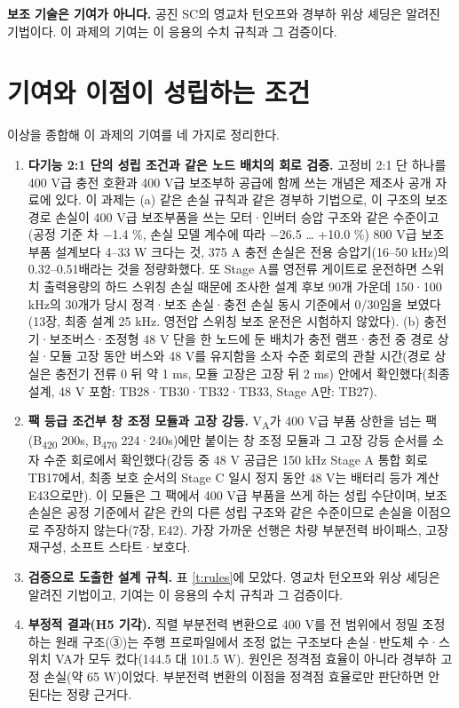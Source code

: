 \textbf{보조 기술은 기여가 아니다.} 공진 SC의 영교차 턴오프\cite{b53,b54}와 경부하 위상 셰딩\cite{b55}은 알려진 기법이다. 이 과제의 기여는 이 응용의 수치 규칙과 그 검증이다.

\section{기여와 이점이 성립하는 조건}

이상을 종합해 이 과제의 기여를 네 가지로 정리한다.

\begin{enumerate}[label=\arabic*.]
\item \textbf{다기능 2:1 단의 성립 조건과 같은 노드 배치의 회로 검증.} 고정비 2:1 단 하나를 400 V급 충전 호환과 400 V급 보조부하 공급에 함께 쓰는 개념은 제조사 공개 자료\cite{b35,b36,b37,b38}에 있다. 이 과제는 (a) 같은 손실 규칙과 같은 경부하 기법으로, 이 구조의 보조 경로 손실이 400 V급 보조부품을 쓰는 모터·인버터 승압 구조와 같은 수준이고(공정 기준 차 −1.4 \%, 손실 모델 계수에 따라 −26.5 … +10.0 \%) 800 V급 보조부품 설계보다 4–33 W 크다는 것, 375 A 충전 손실은 전용 승압기(16–50 kHz)의 0.32–0.51배라는 것을 정량화했다. 또 Stage A를 영전류 게이트로 운전하면 스위치 출력용량의 하드 스위칭 손실 때문에 조사한 설계 후보 90개 가운데 150·100 kHz의 30개가 당시 정격·보조 손실·충전 손실 동시 기준에서 0/30임을 보였다(13장, 최종 설계 25 kHz. 영전압 스위칭 보조 운전은 시험하지 않았다). (b) 충전기·보조버스·조정형 48 V 단을 한 노드에 둔 배치가 충전 램프·충전 중 경로 상실·모듈 고장 동안 버스와 48 V를 유지함을 소자 수준 회로의 관찰 시간(경로 상실은 충전기 전류 0 뒤 약 1 ms, 모듈 고장은 고장 뒤 2 ms) 안에서 확인했다(최종 설계, 48 V 포함: TB28·TB30·TB32·TB33, Stage A만: TB27).
\item \textbf{팩 등급 조건부 창 조정 모듈과 고장 강등.} V\textsubscript{A}가 400 V급 부품 상한을 넘는 팩(B\textsubscript{420} 200s, B\textsubscript{470} 224·240s)에만 붙이는 창 조정 모듈과 그 고장 강등 순서를 소자 수준 회로에서 확인했다(강등 중 48 V 공급은 150 kHz Stage A 통합 회로 TB17에서, 최종 보호 순서의 Stage C 일시 정지 동안 48 V는 배터리 등가 계산 E43으로만). 이 모듈은 그 팩에서 400 V급 부품을 쓰게 하는 성립 수단이며, 보조 손실은 공정 기준에서 같은 칸의 다른 성립 구조와 같은 수준이므로 손실을 이점으로 주장하지 않는다(7장, E42). 가장 가까운 선행은 차량 부분전력 바이패스\cite{b47}, 고장 재구성\cite{b48}, 소프트 스타트·보호\cite{b49}다.
\item \textbf{검증으로 도출한 설계 규칙.} 표 \ref{t:rules}에 모았다. 영교차 턴오프와 위상 셰딩은 알려진 기법이고, 기여는 이 응용의 수치 규칙과 그 검증이다.
\item \textbf{부정적 결과(H5 기각).} 직렬 부분전력 변환으로 400 V를 전 범위에서 정밀 조정하는 원래 구조(③)는 주행 프로파일에서 조정 없는 구조보다 손실·반도체 수·스위치 VA가 모두 컸다(144.5 대 101.5 W). 원인은 정격점 효율이 아니라 경부하 고정 손실(약 65 W)이었다. 부분전력 변환의 이점을 정격점 효율로만 판단하면 안 된다는 정량 근거다.
\end{enumerate}

